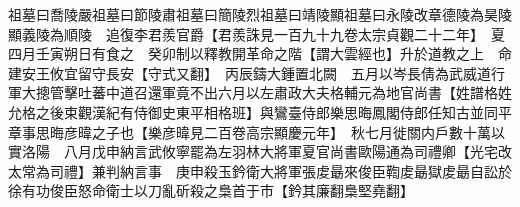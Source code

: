 祖墓曰喬陵嚴祖墓曰節陵肅祖墓曰簡陵烈祖墓曰靖陵顯祖墓曰永陵改章德陵為昊陵顯義陵為順陵　追復李君羨官爵【君羨誅見一百九十九卷太宗貞觀二十二年】　夏四月壬寅朔日有食之　癸卯制以釋教開革命之階【謂大雲經也】升於道教之上　命建安王攸宜留守長安【守式又翻】　丙辰鑄大鍾置北闕　五月以岑長倩為武威道行軍大摠管擊吐蕃中道召還軍竟不出六月以左肅政大夫格輔元為地官尚書【姓譜格姓允格之後束觀漢紀有侍御史東平相格班】與鸞臺侍郎樂思晦鳳閣侍郎任知古並同平章事思晦彦暐之子也【樂彦暐見二百卷高宗顯慶元年】　秋七月徙關内戶數十萬以實洛陽　八月戊申納言武攸寧罷為左羽林大將軍夏官尚書歐陽通為司禮卿【光宅改太常為司禮】兼判納言事　庚申殺玉鈐衛大將軍張䖍朂來俊臣鞫䖍朂獄䖍朂自訟於徐有功俊臣怒命衛士以刀亂斫殺之梟首于市【鈐其廉翻梟堅堯翻】　